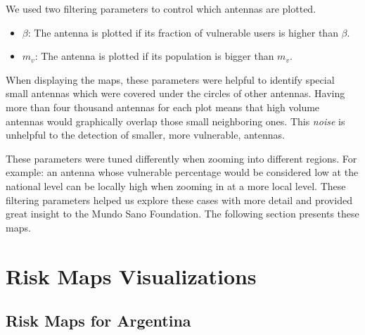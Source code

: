 %

We used two filtering parameters to control which antennas are plotted.
\begin{itemize}
	\item $\beta$: The antenna is plotted if its fraction of vulnerable users is higher than $\beta$.
	\item $m_v$: The antenna is plotted if its population is bigger than $m_v$.
\end{itemize}

When displaying the maps, these parameters were helpful to identify special small antennas which were covered under the circles of other antennas. Having more than four thousand antennas for each plot means that high volume antennas would graphically overlap those small neighboring ones. This \textit{noise} is unhelpful to the detection of smaller, more vulnerable, antennas.

These parameters were tuned differently when zooming into different regions. For example: an antenna whose vulnerable percentage would be considered low at the national level can be locally high when zooming in at a more local level. These filtering parameters helped us explore these cases with more detail and provided great insight to the Mundo Sano Foundation.
The following section presents these maps.

\section{Risk Maps Visualizations}\label{section:riskmaps}

\subsection{Risk Maps for Argentina}


